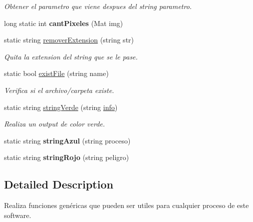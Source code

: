 \begin{DoxyCompactItemize}
\begin{DoxyCompactList}\small\item\em Obtener el parametro que viene despues del string parametro. \end{DoxyCompactList}\item 
\mbox{\label{classCommonFunctions_a96f64cedaa73dd2c2412f98beae60348}} 
long static int {\bfseries cant\+Pixeles} (Mat img)
\item 
static string \mbox{\hyperlink{classCommonFunctions_a5393a67a9e631a763fe5874174e386d0}{remover\+Extension}} (string str)
\begin{DoxyCompactList}\small\item\em Quita la extension del string que se le pase. \end{DoxyCompactList}\item 
static bool \mbox{\hyperlink{classCommonFunctions_a91521d26a009071499a413ef4535ca8a}{exist\+File}} (string name)
\begin{DoxyCompactList}\small\item\em Verifica si el archivo/carpeta existe. \end{DoxyCompactList}\item 
static string \mbox{\hyperlink{classCommonFunctions_a00300c316aebf02cd5917c7335247fba}{string\+Verde}} (string \mbox{\hyperlink{classCommonFunctions_a51a3e18bdcc2c918ebc81f0cc1f47851}{info}})
\begin{DoxyCompactList}\small\item\em Realiza un output de color verde. \end{DoxyCompactList}\item 
\mbox{\label{classCommonFunctions_a62aed3b1ac21b7d1d813e39be5693dc1}} 
static string {\bfseries string\+Azul} (string proceso)
\item 
\mbox{\label{classCommonFunctions_a2d9910d407ce3d46d934068f6bacfe08}} 
static string {\bfseries string\+Rojo} (string peligro)
\end{DoxyCompactItemize}


\subsection{Detailed Description}
Realiza funciones genéricas que pueden ser utiles para cualquier proceso de este software. 


